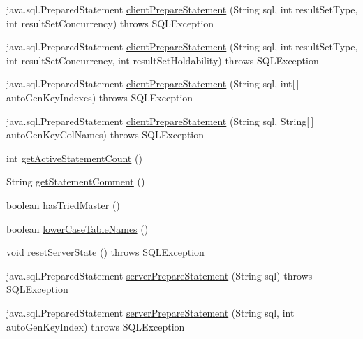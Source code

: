 \begin{DoxyCompactItemize}
\item 
java.\+sql.\+Prepared\+Statement \mbox{\hyperlink{classcom_1_1mysql_1_1cj_1_1jdbc_1_1_connection_wrapper_ac83890b870c7881f93d8907216be47ee}{client\+Prepare\+Statement}} (String sql, int result\+Set\+Type, int result\+Set\+Concurrency)  throws S\+Q\+L\+Exception 
\item 
java.\+sql.\+Prepared\+Statement \mbox{\hyperlink{classcom_1_1mysql_1_1cj_1_1jdbc_1_1_connection_wrapper_ae60c9942657fd3686a4bbe8f21d05050}{client\+Prepare\+Statement}} (String sql, int result\+Set\+Type, int result\+Set\+Concurrency, int result\+Set\+Holdability)  throws S\+Q\+L\+Exception 
\item 
java.\+sql.\+Prepared\+Statement \mbox{\hyperlink{classcom_1_1mysql_1_1cj_1_1jdbc_1_1_connection_wrapper_a1fc94fe8ebcc323191215f63aad419ff}{client\+Prepare\+Statement}} (String sql, int\mbox{[}$\,$\mbox{]} auto\+Gen\+Key\+Indexes)  throws S\+Q\+L\+Exception 
\item 
java.\+sql.\+Prepared\+Statement \mbox{\hyperlink{classcom_1_1mysql_1_1cj_1_1jdbc_1_1_connection_wrapper_acae69d4edeb44d1ecd2f6750e0312341}{client\+Prepare\+Statement}} (String sql, String\mbox{[}$\,$\mbox{]} auto\+Gen\+Key\+Col\+Names)  throws S\+Q\+L\+Exception 
\item 
int \mbox{\hyperlink{classcom_1_1mysql_1_1cj_1_1jdbc_1_1_connection_wrapper_ad356fedacaf160823158cc253f99322a}{get\+Active\+Statement\+Count}} ()
\item 
String \mbox{\hyperlink{classcom_1_1mysql_1_1cj_1_1jdbc_1_1_connection_wrapper_a4fefdf8c3a3be123e8391959185cde40}{get\+Statement\+Comment}} ()
\item 
boolean \mbox{\hyperlink{classcom_1_1mysql_1_1cj_1_1jdbc_1_1_connection_wrapper_a38b81e539492d555536e40cc39bca55b}{has\+Tried\+Master}} ()
\item 
boolean \mbox{\hyperlink{classcom_1_1mysql_1_1cj_1_1jdbc_1_1_connection_wrapper_aba2642633d16efa8be0fd109c0fa9747}{lower\+Case\+Table\+Names}} ()
\item 
void \mbox{\hyperlink{classcom_1_1mysql_1_1cj_1_1jdbc_1_1_connection_wrapper_a420204849914ad076e502ba7753ba6b5}{reset\+Server\+State}} ()  throws S\+Q\+L\+Exception 
\item 
java.\+sql.\+Prepared\+Statement \mbox{\hyperlink{classcom_1_1mysql_1_1cj_1_1jdbc_1_1_connection_wrapper_aa430608c339c22aff456a59210faaf8b}{server\+Prepare\+Statement}} (String sql)  throws S\+Q\+L\+Exception 
\item 
java.\+sql.\+Prepared\+Statement \mbox{\hyperlink{classcom_1_1mysql_1_1cj_1_1jdbc_1_1_connection_wrapper_a86037101987ec03d10b75dbba23a8dff}{server\+Prepare\+Statement}} (String sql, int auto\+Gen\+Key\+Index)  throws S\+Q\+L\+Exception 

\end{DoxyCompactItemize}
